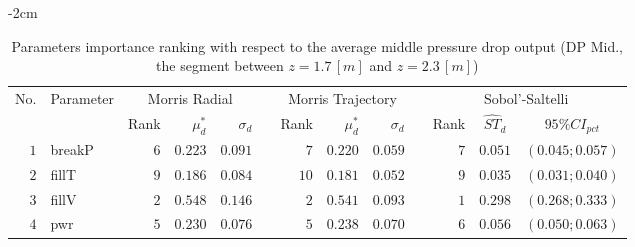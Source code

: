 \begin{table*}[!htbp]\centering
{}
\begin{adjustwidth*}{}{-2cm}
\caption{Parameters importance ranking with respect to the average middle pressure drop output (DP Mid., the segment between $z = 1.7 \, [m]$ and $z = 2.3 \, [m]$)}
\label{tab:app_screening_dpmid_average}
\begin{tabular}{@{}rlrrrrrrrrrcc@{}}\toprule
\multirow{2}{*}{\footnotesize{No.}} & \multirow{2}{*}{\footnotesize{Parameter}} & \multicolumn{3}{c}{\footnotesize{Morris Radial}} & \phantom{a} & \multicolumn{3}{c}{\footnotesize{Morris Trajectory}}  &\phantom{a}& \multicolumn{3}{c}{\footnotesize{Sobol'-Saltelli}}                               \\             
                                                                                  \cmidrule{3-5}                                                   \cmidrule{7-9}                                                      \cmidrule{11-13}
                                    &                                           & \footnotesize{Rank}   & $\mu^*_d$ & $\sigma_d$   &             & \footnotesize{Rank} & $\mu^*_d$ & $\sigma_d$          &           & \footnotesize{Rank} & \footnotesize{$\hat{ST}_d$} & \footnotesize{$95\%CI_{pct}$}\\ \midrule
\footnotesize{$1 $} & \footnotesize{breakP   } & \footnotesize{$6 $} & \footnotesize{$0.223$} & \footnotesize{$0.091$} && \footnotesize{$7 $} & \footnotesize{$0.220$} & \footnotesize{$0.059$} && \footnotesize{$7 $} & \footnotesize{$0.051$} & \footnotesize{$(0.045;0.057)$} \\
\footnotesize{$2 $} & \footnotesize{fillT    } & \footnotesize{$9 $} & \footnotesize{$0.186$} & \footnotesize{$0.084$} && \footnotesize{$10$} & \footnotesize{$0.181$} & \footnotesize{$0.052$} && \footnotesize{$9 $} & \footnotesize{$0.035$} & \footnotesize{$(0.031;0.040)$} \\
\footnotesize{$3 $} & \footnotesize{fillV    } & \footnotesize{$2 $} & \footnotesize{$0.548$} & \footnotesize{$0.146$} && \footnotesize{$2 $} & \footnotesize{$0.541$} & \footnotesize{$0.093$} && \footnotesize{$1 $} & \footnotesize{$0.298$} & \footnotesize{$(0.268;0.333)$} \\
\footnotesize{$4 $} & \footnotesize{pwr      } & \footnotesize{$5 $} & \footnotesize{$0.230$} & \footnotesize{$0.076$} && \footnotesize{$5 $} & \footnotesize{$0.238$} & \footnotesize{$0.070$} && \footnotesize{$6 $} & \footnotesize{$0.056$} & \footnotesize{$(0.050;0.063)$} \\

\end{tabular}
\end{adjustwidth*}
\end{table*}
